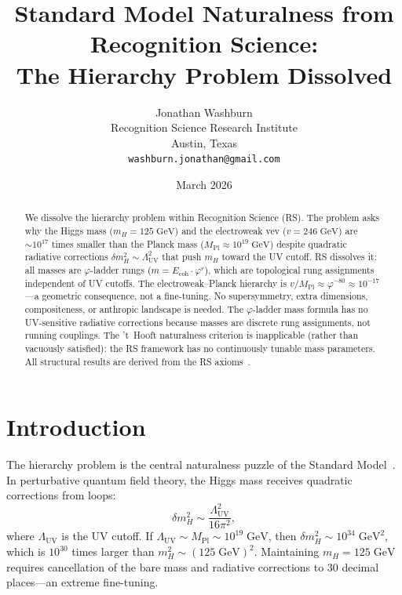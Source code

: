 \documentclass[12pt,a4paper]{article}
\title{Standard Model Naturalness from Recognition Science:\\
The Hierarchy Problem Dissolved}
\author{Jonathan Washburn\\
Recognition Science Research Institute\\
Austin, Texas\\
\texttt{washburn.jonathan@gmail.com}}
\date{March 2026}
\theoremstyle{definition}
\theoremstyle{remark}
\begin{document}
\maketitle

\begin{abstract}
We dissolve the hierarchy problem within Recognition Science (RS).
The problem asks why the Higgs mass ($m_H = 125\;\mathrm{GeV}$) and
the electroweak vev ($v = 246\;\mathrm{GeV}$) are $\sim10^{17}$
times smaller than the Planck mass
($M_{\mathrm{Pl}} \approx 10^{19}\;\mathrm{GeV}$) despite quadratic
radiative corrections $\delta m_H^2 \sim \Lambda_{\mathrm{UV}}^2$
that push $m_H$ toward the UV cutoff.  RS dissolves it: all masses
are $\varphi$-ladder rungs ($m = E_{\mathrm{coh}} \cdot \varphi^r$),
which are topological rung assignments independent of UV cutoffs.
The electroweak--Planck hierarchy is
$v/M_{\mathrm{Pl}} \approx \varphi^{-80} \approx 10^{-17}$---a
geometric consequence, not a fine-tuning.  No supersymmetry, extra
dimensions, compositeness, or anthropic landscape is needed.  The
$\varphi$-ladder mass formula has no UV-sensitive radiative
corrections because masses are discrete rung assignments, not
running couplings.  The 't~Hooft naturalness criterion is
inapplicable (rather than vacuously satisfied): the RS framework
has no continuously tunable mass parameters.  All structural results
are derived from the RS axioms~\cite{RS_Axioms}.
\end{abstract}

\section{Introduction}
\label{sec:intro}

The hierarchy problem is the central naturalness puzzle of the
Standard Model~\cite{tHooft1980}.  In perturbative quantum field
theory, the Higgs mass receives quadratic corrections from loops:
\begin{equation}
  \delta m_H^2 \sim \frac{\Lambda_{\mathrm{UV}}^2}{16\pi^2},
\end{equation}
where $\Lambda_{\mathrm{UV}}$ is the UV cutoff.  If
$\Lambda_{\mathrm{UV}} \sim M_{\mathrm{Pl}} \sim
10^{19}\;\mathrm{GeV}$, then $\delta m_H^2 \sim 10^{34}\;
\mathrm{GeV}^2$, which is $10^{30}$ times larger than
$m_H^2 \sim (125\;\mathrm{GeV})^2$.  Maintaining
$m_H = 125\;\mathrm{GeV}$ requires cancellation of the bare mass
and radiative corrections to 30 decimal places---an extreme
fine-tuning.
\end{document}

